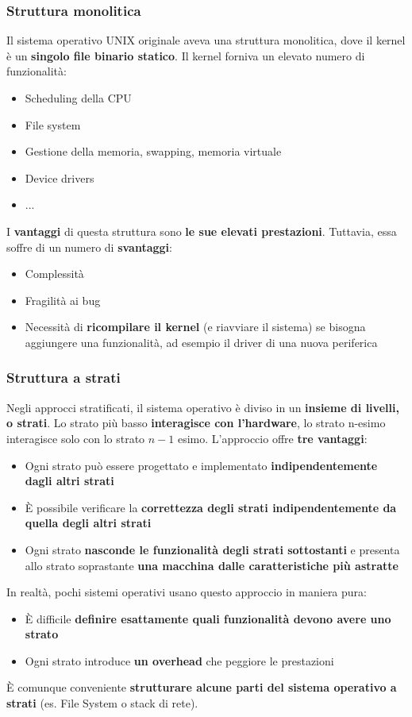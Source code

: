 \documentclass[12pt]{article}
\begin{document}
\subsubsection{Struttura monolitica}
Il sistema operativo UNIX originale aveva una struttura monolitica, dove il kernel è un \textbf{singolo file binario statico}.
Il kernel forniva un elevato numero di funzionalità:
\begin{itemize}
    \item Scheduling della CPU
    \item File system
    \item Gestione della memoria, swapping, memoria virtuale
    \item Device drivers
    \item ...
\end{itemize}
I \textbf{vantaggi} di questa struttura sono \textbf{le sue elevati prestazioni}.
Tuttavia, essa soffre di un numero di \textbf{svantaggi}:
\begin{itemize}
    \item Complessità 
    \item Fragilità ai bug
    \item Necessità di \textbf{ricompilare il kernel} (e riavviare il sistema) se bisogna aggiungere una funzionalità, ad esempio il driver di una nuova periferica
\end{itemize}
\subsubsection{Struttura a strati}
Negli approcci stratificati, il sistema operativo è diviso in un \textbf{insieme di livelli, o strati}.
Lo strato più basso \textbf{interagisce con l'hardware}, lo strato n-esimo interagisce solo con lo strato $n-1$ esimo.
L'approccio offre \textbf{tre vantaggi}:
\begin{itemize}
    \item Ogni strato può essere progettato e implementato \textbf{indipendentemente dagli altri strati}
    \item È possibile verificare la \textbf{correttezza degli strati indipendentemente da quella degli altri strati}
    \item Ogni strato \textbf{nasconde le funzionalità degli strati sottostanti} e presenta allo strato soprastante \textbf{una macchina dalle caratteristiche più astratte}
\end{itemize}
In realtà, pochi sistemi operativi usano questo approccio in maniera pura:
\begin{itemize}
    \item È difficile \textbf{definire esattamente quali funzionalità devono avere uno strato}
    \item Ogni strato introduce \textbf{un overhead} che peggiore le prestazioni
\end{itemize}
È comunque conveniente \textbf{strutturare alcune parti del sistema operativo a strati} (es. File System o stack di rete).
\end{document}
